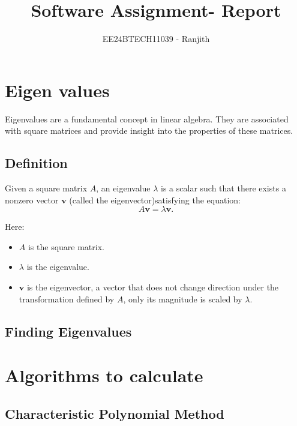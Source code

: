 \documentclass[journal]{IEEEtran}
\begin{document}

\onecolumn
\title{Software Assignment- Report}
\author{EE24BTECH11039 - Ranjith}
\maketitle

\section{Eigen values}



Eigenvalues are a fundamental concept in linear algebra. They are associated with square matrices and provide insight into the properties of these matrices.

\subsection*{Definition}
Given a square matrix $A$, an eigenvalue $\lambda$ is a scalar such that there exists a nonzero vector $\mathbf{v}$ (called the eigenvector)satisfying the equation:
$$
A \mathbf{v} = \lambda \mathbf{v}.
$$

Here:
\begin{itemize}
    \item $A$ is the square matrix.
    \item $\lambda$ is the eigenvalue.
    \item $\mathbf{v}$ is the eigenvector, a vector that does not change direction under the transformation defined by $A$, only its magnitude is scaled by $\lambda$.
\end{itemize}

\subsection*{Finding Eigenvalues}
\section{Algorithms to calculate}

\subsection{Characteristic Polynomial Method}
\end{document}
